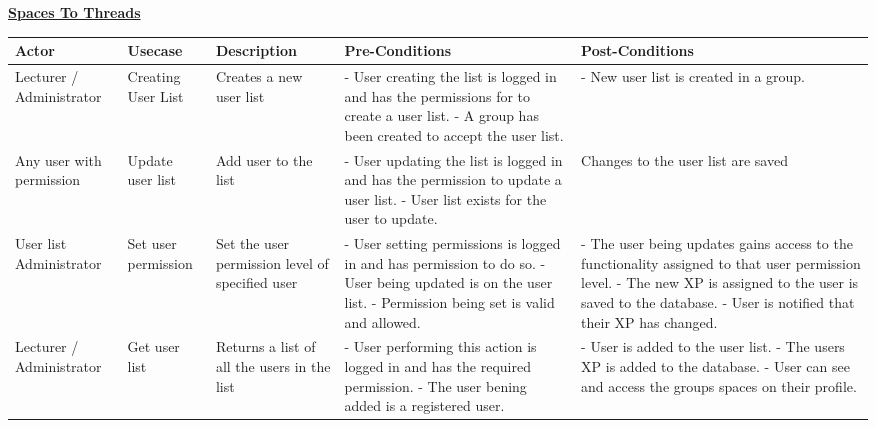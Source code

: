 \documentclass{report}
\begin{document}
	
	\underline{\textbf{\LARGE Spaces To Threads}}

	\begin{table}[h]
		\begin{tabular}{@{}|p{2cm}|p{2cm}|p{3cm}|p{3cm}|p{3cm}|@{}}
			\toprule
			Actor &
			Usecase & 
			Description & 
			Pre-Conditions & 
			Post-Conditions \\ \midrule
			
			Lecturer / Administrator 
			& Creating User List 
			& Creates a new user list
			& - User creating the list is logged in and has the permissions for to create a user list. \newline
			- A group has been created to accept the user list. 
			& - New user list is created in a group.\\ \midrule
			
			Any user with permission 
			& Update user list 
			& Add user to the list
			& - User updating the list is logged in and has the permission to update a user list. \newline 
			- User list exists for the user to update. 
			& Changes to the user list are saved \\ \midrule
			
			User list Administrator
			& Set user permission 
			& Set the user permission level of specified user
			& - User setting permissions is logged in and has permission to do so. \newline 
			- User being updated is on the user list. - Permission being set is valid and allowed. 
			& - The user being updates gains access to the functionality assigned to that user permission level. \newline 
			- The new XP is assigned to the user is saved to the database. \newline - User is notified that their XP has changed. \\ \midrule
			
			Lecturer / Administrator 
			& Get user list
			& Returns a list of all the users in the list
			& - User performing this action is logged in and has the required permission. \newline 
			- The user bening added is a registered user.  
			& - User is added to the user list. \newline 
			- The users XP is added to the database. \newline 
			- User can see and access the groups spaces on their profile. \\ \midrule
		\end{tabular}
	\end{table}			
			
\end{document}
